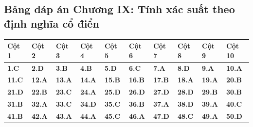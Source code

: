 \documentclass[11pt,a4paper]{article}
\begin{document}
\subsection*{\color{primary} Bảng đáp án Chương IX: Tính xác suất theo định nghĩa cổ điển}
\begin{center}
\renewcommand{\arraystretch}{1.25}
\begin{tabularx}{\textwidth}{*{10}{>{\centering\arraybackslash}X}}
\toprule
\textbf{\color{primary} Cột 1} & \textbf{\color{primary} Cột 2} & \textbf{\color{primary} Cột 3} & \textbf{\color{primary} Cột 4} & \textbf{\color{primary} Cột 5} & \textbf{\color{primary} Cột 6} & \textbf{\color{primary} Cột 7} & \textbf{\color{primary} Cột 8} & \textbf{\color{primary} Cột 9} & \textbf{\color{primary} Cột 10} \\
\midrule
\textbf{1.C} & \textbf{2.D} & \textbf{3.B} & \textbf{4.B} & \textbf{5.D} & \textbf{6.C} & \textbf{7.A} & \textbf{8.D} & \textbf{9.A} & \textbf{10.A} \\
\rowcolor{rowtint} \textbf{11.C} & \textbf{12.A} & \textbf{13.A} & \textbf{14.A} & \textbf{15.B} & \textbf{16.B} & \textbf{17.B} & \textbf{18.A} & \textbf{19.A} & \textbf{20.B} \\
\textbf{21.D} & \textbf{22.B} & \textbf{23.C} & \textbf{24.A} & \textbf{25.D} & \textbf{26.D} & \textbf{27.D} & \textbf{28.D} & \textbf{29.B} & \textbf{30.B} \\
\rowcolor{rowtint} \textbf{31.B} & \textbf{32.A} & \textbf{33.C} & \textbf{34.D} & \textbf{35.C} & \textbf{36.B} & \textbf{37.A} & \textbf{38.D} & \textbf{39.A} & \textbf{40.C} \\
\textbf{41.B} & \textbf{42.A} & \textbf{43.A} & \textbf{44.A} & \textbf{45.C} & \textbf{46.A} & \textbf{47.D} & \textbf{48.C} & \textbf{49.A} & \textbf{50.D} \\
\bottomrule
\end{tabularx}
\end{center}\vspace{10pt}
\end{document}
